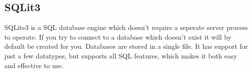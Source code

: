 \subsection{SQLit3}
SQLite3 is a SQL database engine which doesn't require a seperate server process to operate. If you try to connect to a database which doesn't exist it will by default be created for you. Databases are stored in a single file. It has support for just a few datatypes, but supports all SQL features, which makes it both easy and effective to use.